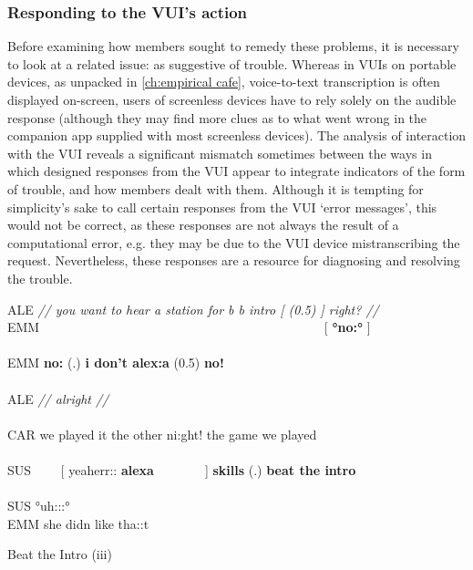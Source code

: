 \subsubsection{Responding to the VUI's action}\label{sec:empirical home findings game responding}
Before examining how members sought to remedy these problems, it is necessary to look at a related issue:  as suggestive of trouble.
Whereas in \acp{VUI} on portable devices, as unpacked in \autoref{ch:empirical cafe}, voice-to-text transcription is often displayed on-screen, users of screenless devices have to rely solely on the audible response (although they may find more clues as to what went wrong in the companion app supplied with most screenless devices).
The analysis of interaction with the \ac{VUI} reveals a significant mismatch sometimes between the ways in which designed responses from the \ac{VUI} appear to integrate indicators of the form of trouble, and how members dealt with them.
Although it is tempting for simplicity's sake to call certain responses from the \ac{VUI} `error messages', this would not be correct, as these responses are not always the result of a computational error, e.g. they may be due to the \ac{VUI} device mistranscribing the request.
Nevertheless, these responses are a resource for diagnosing and resolving the trouble.

\begin{inlinefrag}
    {
    \begin{transcript}[35]
        \by ALE {\textit{// you want to hear a station for b b intro [ (0.5) ] right? //}} \\
        \by EMM {~~~~~~~~~~~~~~~~~~~~~~~~~~~~~~~~~~~~~~~~~~~~[ \textbf{°no:°} ] } \\
         \\
        \by EMM {\textbf{no:} (.) \textbf{i don't alex:a} (0.5) \textbf{no!}} \\
         \\
        \by ALE {\textit{// alrig\intUp{}ht //}} \\
         \\
        \by CAR {we played it the other ni:ght! the game we played} \\
         \\
        \by SUS {~~~~[ yeaherr:: \textbf{alexa}~~~~~~~~] \textbf{skills} (.) \textbf{beat the intro}} \\
         \\
        \by SUS {°uh::\intDown:° } \\
        \by EMM {she didn like tha:\intDown:t} \\
    \end{transcript}
    \caption{Beat the Intro (iii)}\label{frag:empirical home findings game-iii}
    }
\end{inlinefrag}


